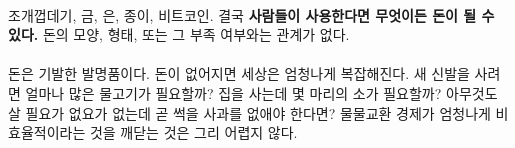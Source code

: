 
\paragraph{}
조개껍데기, 금, 은, 종이, 비트코인. 결국 \textbf{사람들이 사용한다면 무엇이든 돈이 될 수 있다.}
돈의 모양, 형태, 또는 그 부족 여부와는 관계가 없다.


\paragraph{}
돈은 기발한 발명품이다.
돈이 없어지면 세상은 엄청나게 복잡해진다.
새 신발을 사려면 얼마나 많은 물고기가 필요할까? 
집을 사는데 몇 마리의 소가 필요할까? 
아무것도 살 필요가 없요가 없는데 곧 썩을 사과를 없애야 한다면? 
물물교환 경제가 엄청나게 비효율적이라는 것을 깨닫는 것은 그리 어렵지 않다.



\begin{comment}
	돈의 가장 큰 장점은 무엇과도 교환할 수 있다는 것이다. 정말 대단한 발명품이다. 
	닉 재보\footnote{\url{http://unenumerated.blogspot.com/}}는 
	셸링 아웃: 화폐의 기원(Shelling out\footnote{역자: Shell out은 '지불하다.'라는 뜻으로 쓰이는데, 조개(shell)를 지불하는 데서 유래되었다고 한다.}: The Origins of Money)\cite{shelling-out}에서 
	이에 대해 훌륭하게 요약했다.
	\enquote{우리 인간은 상아, 조개, 특수 뼈와 같은 희귀한 재료로 만든 구슬, 다양한 종류의 장신구, 
		나중에는 은과 금과 같은 희귀 금속까지 모든 종류의 것을 돈으로 사용했다.}
\end{comment}


